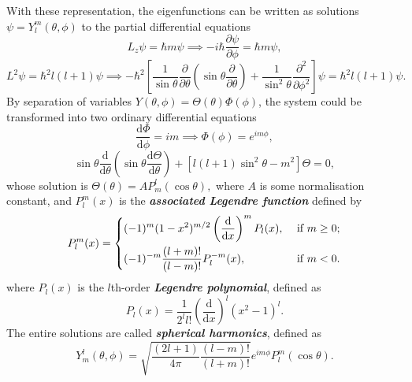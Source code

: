 \documentclass{article}
\theoremstyle{nonumberplain}
\begin{document}
With these representation, the eigenfunctions can be written as solutions $\psi = Y_l^m (\theta , \phi )$ to the partial differential equations 
\[
    L_z \psi = \hbar m \psi  
    \implies  - i \hbar \frac{\partial \psi }{\partial \phi }  = \hbar m \psi, 
\]
\[
    L^2 \psi = \hbar ^2 l(l+1) \psi 
    \implies  -\hbar^2 \left[ 
        \frac{1}{\sin \theta } \frac{\partial }{\partial \theta } \left( 
            \sin \theta \frac{\partial }{\partial \theta } 
        \right) + \frac{1}{\sin ^2 \theta } \frac{\partial ^2 }{\partial \phi ^2 } 
    \right] \psi = \hbar ^2 l(l+1) \psi.
\]
By separation of variables $Y(\theta ,\phi ) = \Theta (\theta ) \Phi (\phi )$, the system could be transformed into two ordinary differential equations  
\[
    \frac{\mathrm{d}\Phi }{\mathrm{d}\phi } = im \implies 
    \Phi (\phi ) = e^{i m \phi }, 
\]
\[
    \sin \theta \frac{\mathrm{d}}{\mathrm{d}\theta } \left( 
        \sin \theta  \frac{\mathrm{d}\Theta }{\mathrm{d}\theta } 
    \right) + \left[ 
        l(l+1) \sin ^2 \theta - m^2
    \right] \Theta =0,
\]
whose solution is 
\(
    \Theta (\theta ) = A P_m^l (\cos \theta ),
\) 
where $A$ is some normalisation constant, and $P_l^m(x)$ is the \textit{\textbf{associated Legendre function}} defined by 
\[
    P_l^m(x) =
    \begin{dcases}
        (-1)^m (1-x^2)^{m /2} \left( 
            \frac{\mathrm{d}}{\mathrm{d}x} 
        \right)^m P_l (x), &\text{ if } m \geq 0 ;\\
        (-1)^{-m} \frac{(l+m)!}{(l-m)!} P_l^{-m}(x), &\text{ if } m<0 .
    \end{dcases}
\]
where $P_l(x)$ is the $l$th-order \textit{\textbf{Legendre polynomial}}, defined as 
\[
    P_l(x) = \frac{1}{2^l l!} \left( 
        \frac{\mathrm{d}}{\mathrm{d}x}  
    \right)^l (x^2 -1)^l. 
\] 
The entire solutions are called \textit{\textbf{spherical harmonics}}, defined as 
\begin{equation}
    \label{eq:spherical-harmonics}
    Y_m^l(\theta ,\phi ) 
    = \sqrt{\frac{(2l+1)}{4 \pi } \frac{(l-m)!}{(l+m)!}} e^{i m \phi } P_l^m (\cos \theta ).
\end{equation}
\end{document}
